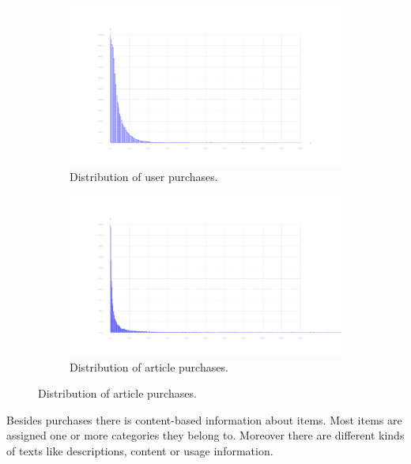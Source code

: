 \documentclass[10pt]{reportMaster}
\begin{document}
\begin{figure}
	\label{fig:dataDistribution}
	\begin{subfigure}[c]{1\textwidth}
		\caption{Distribution of user purchases.}
		\centering
		\includegraphics[width=1\textwidth]{figures/experiments/userPurchaseHistogram}
	\end{subfigure}
	\begin{subfigure}[c]{1\textwidth}
		\caption{Distribution of article purchases.}
		\centering
		\includegraphics[width=1\textwidth]{figures/experiments/articlePurchaseHistogram_partly}
	\end{subfigure}
	
\end{figure}

Besides purchases there is content-based information about items.
Most items are assigned one or more categories they belong to.
Moreover there are different kinds of texts like descriptions, content or usage information.

\end{document}
